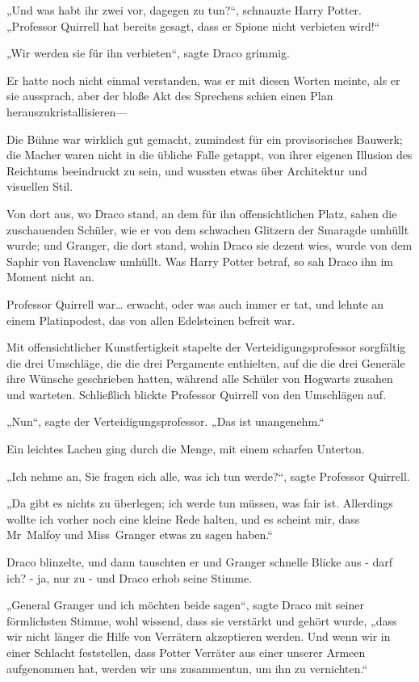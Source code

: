 {„Und was habt ihr zwei vor, dagegen zu tun?“, schnauzte Harry Potter. „Professor Quirrell hat bereits gesagt, dass er Spione nicht verbieten wird!“

„Wir werden sie für ihn verbieten“, sagte Draco grimmig.

Er hatte noch nicht einmal verstanden, was er mit diesen Worten meinte, als er sie aussprach, aber der bloße Akt des Sprechens schien einen Plan herauszukristallisieren—

Die Bühne war wirklich gut gemacht, zumindest für ein provisorisches Bauwerk; die Macher waren nicht in die übliche Falle getappt, von ihrer eigenen Illusion des Reichtums beeindruckt zu sein, und wussten etwas über Architektur und visuellen Stil.

Von dort aus, wo Draco stand, an dem für ihn offensichtlichen Platz, sahen die zuschauenden Schüler, wie er von dem schwachen Glitzern der Smaragde umhüllt wurde; und Granger, die dort stand, wohin Draco sie dezent wies, wurde von dem Saphir von Ravenclaw umhüllt. Was Harry Potter betraf, so sah Draco ihn im Moment nicht an.

Professor Quirrell war… erwacht, oder was auch immer er tat, und lehnte an einem Platinpodest, das von allen Edelsteinen befreit war.

Mit offensichtlicher Kunstfertigkeit stapelte der Verteidigungsprofessor sorgfältig die drei Umschläge, die die drei Pergamente enthielten, auf die die drei Generäle ihre Wünsche geschrieben hatten, während alle Schüler von Hogwarts zusahen und warteten. Schließlich blickte Professor Quirrell von den Umschlägen auf.

„Nun“, sagte der Verteidigungsprofessor. „Das ist unangenehm.“

Ein leichtes Lachen ging durch die Menge, mit einem scharfen Unterton.

„Ich nehme an, Sie fragen sich alle, was ich tun werde?“, sagte Professor Quirrell.

„Da gibt es nichts zu überlegen; ich werde tun müssen, was fair ist. Allerdings wollte ich vorher noch eine kleine Rede halten, und es scheint mir, dass Mr~Malfoy und Miss~Granger etwas zu sagen haben.“

Draco blinzelte, und dann tauschten er und Granger schnelle Blicke aus - darf ich? - ja, nur zu - und Draco erhob seine Stimme.

„General Granger und ich möchten beide sagen“, sagte Draco mit seiner förmlichsten Stimme, wohl wissend, dass sie verstärkt und gehört wurde, „dass wir nicht länger die Hilfe von Verrätern akzeptieren werden. Und wenn wir in einer Schlacht feststellen, dass Potter Verräter aus einer unserer Armeen aufgenommen hat, werden wir uns zusammentun, um ihn zu vernichten.“

}
